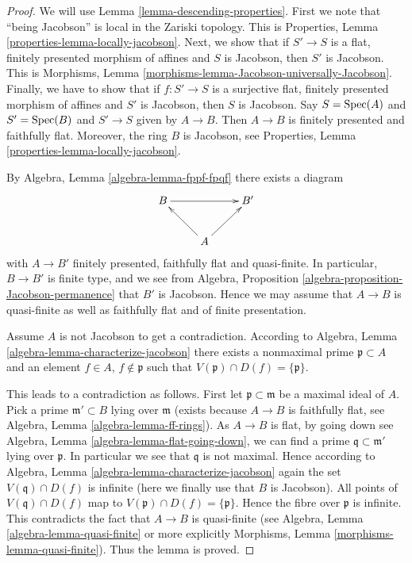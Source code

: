 \begin{proof}
We will use Lemma \ref{lemma-descending-properties}.
First we note that ``being Jacobson'' is local
in the Zariski topology. This is
Properties, Lemma \ref{properties-lemma-locally-jacobson}.
Next, we show that if $S' \to S$ is a flat, finitely presented
morphism of affines and $S$ is Jacobson, then $S'$ is
Jacobson. This is
Morphisms, Lemma \ref{morphisms-lemma-Jacobson-universally-Jacobson}.
Finally, we have to show that if $f : S' \to S$ is a surjective
flat, finitely presented morphism of affines and $S'$ is
Jacobson, then $S$ is Jacobson. Say $S = \mathop{\mathrm{Spec}}(A)$ and
$S' = \mathop{\mathrm{Spec}}(B)$ and $S' \to S$ given by $A \to B$.
Then $A \to B$ is finitely presented and faithfully flat.
Moreover, the ring $B$ is Jacobson, see
Properties, Lemma \ref{properties-lemma-locally-jacobson}.

\medskip\noindent
By Algebra, Lemma \ref{algebra-lemma-fppf-fpqf} there exists a diagram
$$
\xymatrix{
B \ar[rr] & & B' \\
& A \ar[ru] \ar[lu] &
}
$$
with $A \to B'$ finitely presented, faithfully flat and quasi-finite.
In particular, $B \to B'$ is finite type, and we see from
Algebra, Proposition \ref{algebra-proposition-Jacobson-permanence}
that $B'$ is Jacobson. Hence we may assume that $A \to B$ is quasi-finite
as well as faithfully flat and of finite presentation.

\medskip\noindent
Assume $A$ is not Jacobson to get a contradiction.
According to Algebra, Lemma \ref{algebra-lemma-characterize-jacobson}
there exists a nonmaximal prime $\mathfrak p \subset A$ and
an element $f \in A$, $f \not \in \mathfrak p$ such that
$V(\mathfrak p) \cap D(f) = \{\mathfrak p\}$.

\medskip\noindent
This leads to a contradiction as follows. First let
$\mathfrak p \subset \mathfrak m$ be a maximal ideal of $A$.
Pick a prime $\mathfrak m' \subset B$ lying over $\mathfrak m$
(exists because $A \to B$ is faithfully flat, see
Algebra, Lemma \ref{algebra-lemma-ff-rings}).
As $A \to B$ is flat, by going down see
Algebra, Lemma \ref{algebra-lemma-flat-going-down},
we can find a prime $\mathfrak q \subset \mathfrak m'$ lying over
$\mathfrak p$. In particular we see that $\mathfrak q$ is not
maximal. Hence according to
Algebra, Lemma \ref{algebra-lemma-characterize-jacobson} again
the set $V(\mathfrak q) \cap D(f)$ is infinite
(here we finally use that $B$ is Jacobson).
All points of $V(\mathfrak q) \cap D(f)$ map to
$V(\mathfrak p) \cap D(f) = \{\mathfrak p\}$. Hence the
fibre over $\mathfrak p$ is infinite. This contradicts the
fact that $A \to B$ is quasi-finite (see
Algebra, Lemma \ref{algebra-lemma-quasi-finite}
or more explicitly
Morphisms, Lemma \ref{morphisms-lemma-quasi-finite}).
Thus the lemma is proved.
\end{proof}

